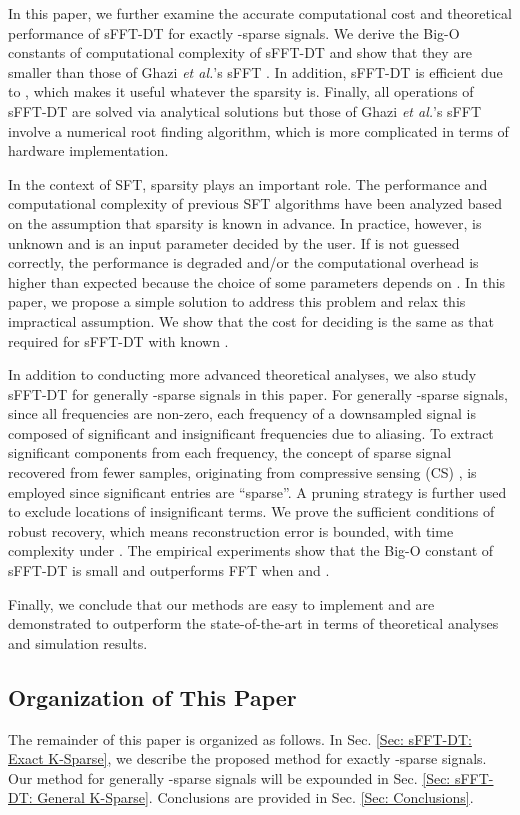 \documentclass[journal,onecolumn,11pt]{IEEEtran}
\begin{document}
In this paper, we further examine the accurate computational cost and theoretical performance of sFFT-DT for exactly -sparse signals.
We derive the Big-O constants of computational complexity of sFFT-DT and show that they are smaller than those of Ghazi {\em et al.}'s sFFT \cite{Ghazi2013}.
In addition, sFFT-DT is efficient due to , which makes it useful whatever the sparsity  is.
Finally, all operations of sFFT-DT are solved via analytical solutions but those of Ghazi {\em et al.}'s sFFT involve a numerical root finding algorithm, which is more complicated in terms of hardware implementation.

In the context of SFT, sparsity  plays an important role.
The performance and computational complexity of previous SFT algorithms \cite{Haitham2012}\cite{Haitham2012_1}\cite{Ghazi2013}\cite{Pawar2013} have been analyzed based on the assumption that sparsity  is known in advance.
In practice, however,  is unknown and is an input parameter decided by the user.
If  is not guessed correctly, the performance is degraded and/or the computational overhead is higher than expected because the choice of some parameters depends on .
In this paper, we propose a simple solution to address this problem and relax this impractical assumption.
We show that the cost for deciding  is the same as that required for sFFT-DT with known .

In addition to conducting more advanced theoretical analyses, we also study sFFT-DT for generally -sparse signals in this paper.
For generally -sparse signals, since all frequencies are non-zero, each frequency of a downsampled signal is composed of significant and insignificant frequencies due to aliasing.
To extract significant components from each frequency, the concept of sparse signal recovered from fewer samples, originating from compressive sensing (CS) \cite{Donoho2006}, is employed since significant entries are ``sparse''. A pruning strategy is further used to exclude locations of insignificant terms.
We prove the sufficient conditions of robust recovery, which means reconstruction error is bounded, with time complexity  under .
The empirical experiments show that the Big-O constant of sFFT-DT is small and outperforms FFT when  and .

Finally, we conclude that our methods are easy to implement and are demonstrated to outperform the state-of-the-art in terms of theoretical analyses and simulation results.

\subsection{Organization of This Paper}
The remainder of this paper is organized as follows.
In Sec. \ref{Sec: sFFT-DT: Exact K-Sparse}, we describe the proposed method for exactly -sparse signals.
Our method for generally -sparse signals will be expounded in Sec. \ref{Sec: sFFT-DT: General K-Sparse}.
Conclusions are provided in Sec. \ref{Sec: Conclusions}.
\end{document}

